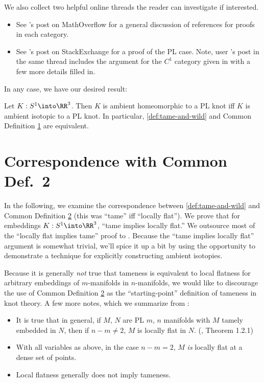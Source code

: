 We also collect two helpful online threads the reader can investigate
if interested.
\begin{itemize}
  \item See \cite{MO-equiv}'s post on MathOverflow for a general
    discussion of references for proofs in each category.
  \item See \cite{SE-equiv}'s post on StackExchange for a proof of the
    PL case. Note, user
    \cite{WhippedCream}'s post in the same thread includes the
    argument for the $C^1$ category given in
    \cite{milnor1997topology} with a few more details filled in.
\end{itemize}
In any case, we have our desired result:
\begin{corollary}\label{cor:equivalence-of-cdef1}
  Let $K : S^1 \into \RR^3$. Then $K$ is ambient homeomorphic to a PL
  knot iff $K$ is ambient isotopic to a PL knot. In particular,
  \cref{def:tame-and-wild} and Common Definition
  \hyperlink{def:cdef1b}{1} are equivalent.
\end{corollary}


\section{Correspondence with Common Def.\ 2}\label{sec:corr-cdef-2}
In the following, we examine the correspondence between
\cref{def:tame-and-wild} and Common Definition
\hyperlink{def:cdef2b}{2} (this was ``tame'' iff ``locally flat''). We
prove that for embeddings $K : S^1 \into \RR^3$, ``tame implies
locally flat.'' We outsource most of the ``locally flat implies tame''
proof to \cite{Bing}. Because the ``tame implies locally flat''
argument is somewhat trivial, we'll spice it up a bit by using the
opportunity to demonstrate a technique for explicitly constructing
ambient isotopies.

Because it is generally \emph{not} true that tameness is equivalent to
local flatness for arbitrary embeddings of $m$-manifolds in
$n$-manifolds, we would like to discourage the use of Common
Definition \hyperlink{def:cdef2b}{2} as the ``starting-point''
definition of tameness in knot theory. A few more notes, which we
summarize from \cite{Daverman}:
\begin{itemize}
  \item It is true that in general, if $M$, $N$ are PL $m$, $n$
    manifolds with $M$ tamely embedded in $N$, then if $n - m \neq 2$,
    $M$ is locally flat in $N$. (\cite{Daverman}, Theorem 1.2.1)
  \item With all variables as above, in the case $n - m = 2$, $M$
    \emph{is} locally flat at a dense set of points.
  \item Local flatness generally does not imply tameness.
\end{itemize}

